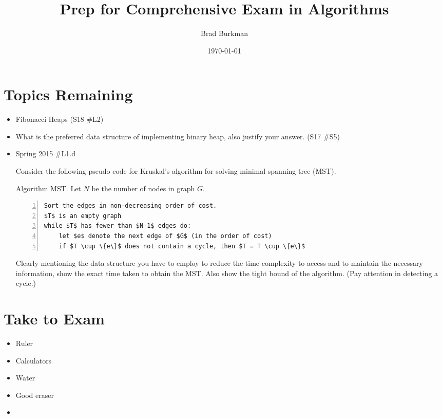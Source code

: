 \documentclass[11pt]{report}
\title{Prep for Comprehensive Exam in Algorithms}
\author{Brad Burkman}
\date{\today}
\begin{document}
\setlength{\parindent}{20pt}
\begin{spacing}{1.2}
\maketitle
\tableofcontents
{}
\printindex

\section{Topics Remaining}

\begin{itemize}
	\item Fibonacci Heaps (S18 \#L2)
	\item What is the preferred data structure of implementing binary heap, also justify your answer.  (S17 \#S5)
	\item Spring 2015 \#L1.d

Consider the following pseudo code for Kruskal's algorithm for solving minimal spanning tree (MST).

Algorithm MST.  Let $N$ be the number of nodes in graph $G$.  

\begin{lstlisting}[numbers=left, mathescape=True]
Sort the edges in non-decreasing order of cost.
$T$ is an empty graph
while $T$ has fewer than $N-1$ edges do:
	let $e$ denote the next edge of $G$ (in the order of cost)
	if $T \cup \{e\}$ does not contain a cycle, then $T = T \cup \{e\}$
\end{lstlisting}

Clearly mentioning the data structure you have to employ to reduce the time complexity to access and to maintain the necessary information, show the exact time taken to obtain the MST.  Also show the tight bound of the algorithm.  (Pay attention in detecting a cycle.)
		
\end{itemize}

\section{Take to Exam}

\begin{itemize}
	\item Ruler
	\item Calculators
	\item Water
	\item Good eraser
	\item 
\end{itemize}



\end{spacing}
\end{document}
